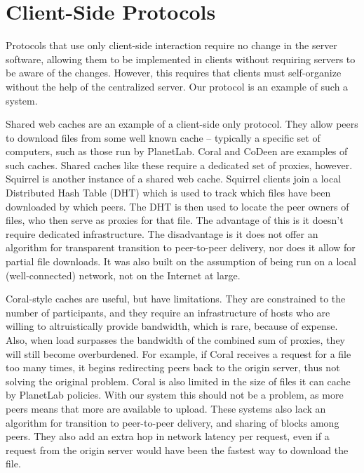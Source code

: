 \section{Client-Side Protocols}
Protocols that use only client-side interaction require no change in the server software, allowing them to be implemented in clients without requiring servers to be aware of the changes.  However, this requires that clients must self-organize without the help of the centralized server.  Our protocol is an example of such a system.

Shared web caches are an example of a client-side only protocol.  They allow peers to download files from some well known cache -- typically a specific set of computers, such as those run by PlanetLab.  Coral \cite{coral} and CoDeen \cite{codeen} are examples of such caches.  Shared caches like these require a dedicated set of proxies, however.  
Squirrel \cite{squirrel} is another instance of a shared web cache.  Squirrel clients join a local Distributed Hash Table (DHT) 
which is used to track which files have been downloaded by which peers.  
The DHT is then used to locate the peer owners of files, who then serve as proxies for that file.  
The advantage of this is it doesn't require dedicated infrastructure.  
The disadvantage is it does not offer an algorithm for transparent transition to peer-to-peer delivery, nor does it allow for partial file downloads.  It was also built on the assumption of being run on a local (well-connected) network, not on the Internet at large.

Coral-style caches are useful, but have limitations.  They are constrained to the number of participants, and they require an infrastructure of hosts who are willing to altruistically provide bandwidth, which is rare, because of expense.  Also, when load surpasses the bandwidth of the 
combined sum of proxies, they will still become overburdened.  For example, if Coral receives a request for a file too many times, it begins redirecting peers back to the origin server, thus not solving the original problem.  
Coral is also limited in the size of files it can cache by PlanetLab policies.  With our system this should not be a problem, as more peers means that more are available to upload.  These systems also lack an algorithm for transition to peer-to-peer delivery, and sharing of blocks among peers.  They also add an extra hop in network latency per request, even if a request from the origin server would have been the fastest way to download the file.    

